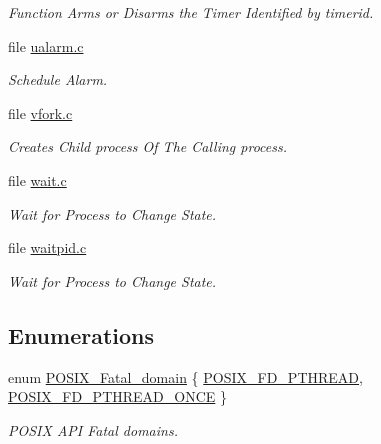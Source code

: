 \begin{DoxyCompactItemize}
\begin{DoxyCompactList}\small\item\em Function Arms or Disarms the Timer Identified by timerid. \end{DoxyCompactList}\item 
file \mbox{\hyperlink{ualarm_8c}{ualarm.\+c}}
\begin{DoxyCompactList}\small\item\em Schedule Alarm. \end{DoxyCompactList}\item 
file \mbox{\hyperlink{vfork_8c}{vfork.\+c}}
\begin{DoxyCompactList}\small\item\em Creates Child process Of The Calling process. \end{DoxyCompactList}\item 
file \mbox{\hyperlink{wait_8c}{wait.\+c}}
\begin{DoxyCompactList}\small\item\em Wait for Process to Change State. \end{DoxyCompactList}\item 
file \mbox{\hyperlink{waitpid_8c}{waitpid.\+c}}
\begin{DoxyCompactList}\small\item\em Wait for Process to Change State. \end{DoxyCompactList}\end{DoxyCompactItemize}
\subsection*{Enumerations}
\begin{DoxyCompactItemize}
\item 
enum \mbox{\hyperlink{group__POSIXAPI_gaac30333ed4742bd2355e87a0cf4461e4}{P\+O\+S\+I\+X\+\_\+\+Fatal\+\_\+domain}} \{ \mbox{\hyperlink{group__POSIXAPI_ggaac30333ed4742bd2355e87a0cf4461e4a2db4739b997f6d2b0d55af9228a98a1b}{P\+O\+S\+I\+X\+\_\+\+F\+D\+\_\+\+P\+T\+H\+R\+E\+AD}}, 
\mbox{\hyperlink{group__POSIXAPI_ggaac30333ed4742bd2355e87a0cf4461e4a6b8109f16195a73bf04c56663c2128bc}{P\+O\+S\+I\+X\+\_\+\+F\+D\+\_\+\+P\+T\+H\+R\+E\+A\+D\+\_\+\+O\+N\+CE}}
 \}
\begin{DoxyCompactList}\small\item\em P\+O\+S\+IX A\+PI Fatal domains. \end{DoxyCompactList}\end{DoxyCompactItemize}
